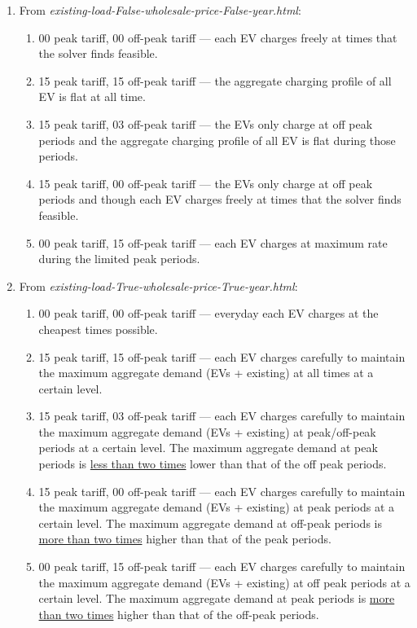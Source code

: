 \documentclass[a4paper, oneandhalfspace]{llncs}
\begin{document}
\begin{enumerate}
	\item From \textit{existing-load-False-wholesale-price-False-year.html}:
	
	\begin{enumerate}
		\item 00 peak tariff, 00 off-peak tariff --- each EV charges freely at times that the solver finds feasible. 
		\item 15 peak tariff, 15 off-peak tariff --- the aggregate charging profile of all EV is flat at all time. 
		\item 15 peak tariff, 03 off-peak tariff --- the EVs only charge at off peak periods and the aggregate charging profile of all EV is flat during those periods. 
		\item 15 peak tariff, 00 off-peak tariff --- the EVs only charge at off peak periods and though each EV charges freely at times that the solver finds feasible.
		\item 00 peak tariff, 15 off-peak tariff --- each EV charges at maximum rate during the limited peak periods. 
	\end{enumerate}

	\item From \textit{existing-load-True-wholesale-price-True-year.html}:
	
		\begin{enumerate}
		\item 00 peak tariff, 00 off-peak tariff --- everyday each EV charges at the cheapest times possible.
		\item 15 peak tariff, 15 off-peak tariff --- each EV charges carefully to maintain the maximum aggregate demand (EVs + existing) at all times at a certain level.
		\item 15 peak tariff, 03 off-peak tariff --- each EV charges carefully to maintain the maximum aggregate demand (EVs + existing) at peak/off-peak periods at a certain level. The maximum aggregate demand at peak periods is \underline{less than two times} lower than that of the off peak periods. 
		\item 15 peak tariff, 00 off-peak tariff --- each EV charges carefully to maintain the maximum aggregate demand (EVs + existing) at peak periods at a certain level. The maximum aggregate demand at off-peak periods is \underline{more than two times} higher than that of the peak periods.
		\item 00 peak tariff, 15 off-peak tariff --- each EV charges carefully to maintain the maximum aggregate demand (EVs + existing) at off peak periods at a certain level. The maximum aggregate demand at peak periods is \underline{more than two times} higher than that of the off-peak periods.
	\end{enumerate}


\end{enumerate}
\end{document}
